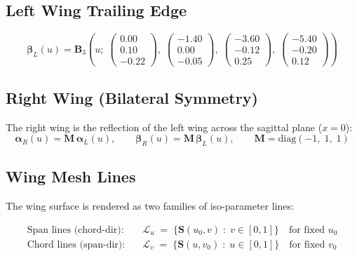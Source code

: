 \documentclass[12pt,a4paper]{article}
\newcommand{\vv}[1]{\bm{#1}}          %
\begin{document}
\subsection{Left Wing Trailing Edge}
\begin{equation}
  \vv{\beta}_L(u)
  = \vv{B}_3\!\left(u;\;
    \begin{pmatrix}0.00\\0.10\\-0.22\end{pmatrix},\;
    \begin{pmatrix}-1.40\\0.00\\-0.05\end{pmatrix},\;
    \begin{pmatrix}-3.60\\-0.12\\0.25\end{pmatrix},\;
    \begin{pmatrix}-5.40\\-0.20\\0.12\end{pmatrix}
  \right)
\end{equation}

\subsection{Right Wing (Bilateral Symmetry)}
The right wing is the reflection of the left wing across the sagittal plane
($x = 0$):
\begin{equation}
  \vv{\alpha}_R(u) = \vv{M}\,\vv{\alpha}_L(u),
  \qquad
  \vv{\beta}_R(u)  = \vv{M}\,\vv{\beta}_L(u),
  \qquad
  \vv{M} = \mathrm{diag}(-1,\;1,\;1)
\end{equation}

\subsection{Wing Mesh Lines}
The wing surface is rendered as two families of iso-parameter lines:

\begin{align}
  \text{Span lines (chord-dir):}\quad
  &\mathcal{L}_u \;=\; \bigl\{\vv{S}(u_0,v)\;:\;v\in[0,1]\bigr\}
  \quad\text{for fixed }u_0 \\[4pt]
  \text{Chord lines (span-dir):}\quad
  &\mathcal{L}_v \;=\; \bigl\{\vv{S}(u,v_0)\;:\;u\in[0,1]\bigr\}
  \quad\text{for fixed }v_0
\end{align}
\end{document}
